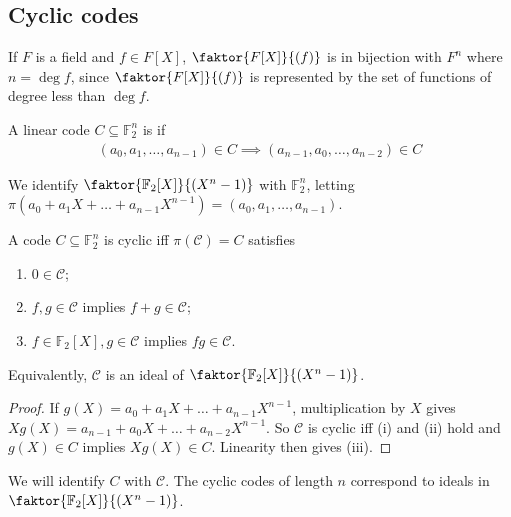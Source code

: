 \subsection{Cyclic codes}
If $F$ is a field and $f \in F[X]$, $\faktor{F[X]}{(f)}$ is in bijection with $F^n$ where $n = \deg f$, since $\faktor{F[X]}{(f)}$ is represented by the set of functions of degree less than $\deg f$.
\begin{definition}
    A linear code $C \subseteq \mathbb F_2^n$ is  if
    \begin{align*}
        (a_0, a_1, \dots, a_{n-1}) \in C \implies (a_{n-1}, a_0, \dots, a_{n-2}) \in C
    \end{align*}
\end{definition}
We identify $\faktor{\mathbb F_2[X]}{(X^n - 1)}$ with $\mathbb F_2^n$, letting $\pi(a_0 + a_1X + \dots + a_{n-1}X^{n-1}) = (a_0, a_1, \dots, a_{n-1})$.
\begin{lemma}
    A code $C \subseteq \mathbb F_2^n$ is cyclic iff $\pi(\mathcal C) = C$ satisfies
    \begin{enumerate}
        \item $0 \in \mathcal C$;
        \item $f, g \in \mathcal C$ implies $f + g \in \mathcal C$;
        \item $f \in \mathbb F_2[X], g \in \mathcal C$ implies $fg \in \mathcal C$.
    \end{enumerate}
\end{lemma}
Equivalently, $\mathcal C$ is an ideal of $\faktor{\mathbb F_2[X]}{(X^n - 1)}$.
\begin{proof}
    If $g(X) = a_0 + a_1X + \dots + a_{n-1}X^{n-1}$, multiplication by $X$ gives $Xg(X) = a_{n-1} + a_0X + \dots + a_{n-2}X^{n-1}$.
    So $\mathcal C$ is cyclic iff (i) and (ii) hold and $g(X) \in C$ implies $Xg(X) \in C$.
    Linearity then gives (iii).
\end{proof}
We will identify $C$ with $\mathcal C$.
The cyclic codes of length $n$ correspond to ideals in $\faktor{\mathbb F_2[X]}{(X^n - 1)}$.
